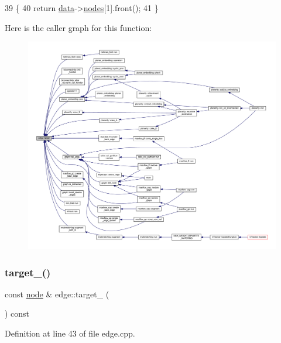 \begin{DoxyCode}
39 \{
40     \textcolor{keywordflow}{return} \mbox{\hyperlink{classedge_a0ebb6dfa28b77f47529085049352b436}{data}}->\mbox{\hyperlink{classedge__data_a870bbbb05de6c5f63d434db624c55dd4}{nodes}}[1].front();
41 \}
\end{DoxyCode}
Here is the caller graph for this function\+:\nopagebreak
\begin{figure}[H]
\begin{center}
\leavevmode
\includegraphics[width=350pt]{classedge_a97563b611261478ee19c6ce055f1a3ee_icgraph}
\end{center}
\end{figure}
\mbox{\label{classedge_aa8e46723982d3e630377fb75669711de}} 
\subsubsection{\texorpdfstring{target\+\_\+()}{target\_()}}
{\footnotesize\ttfamily const \mbox{\hyperlink{classnode}{node}} \& edge\+::target\+\_\+ (\begin{DoxyParamCaption}{ }\end{DoxyParamCaption}) const}



Definition at line 43 of file edge.\+cpp.


